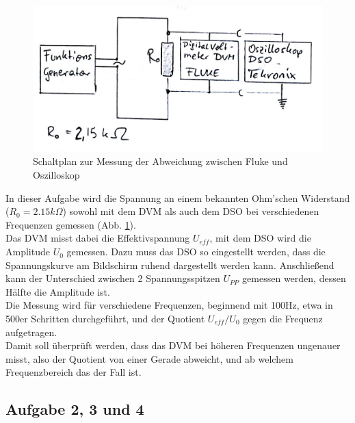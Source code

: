 \documentclass[12pt,a4paper]{article}
\begin{document}
\begin{multicols}{2}
\begin{figure}[H]
	\centering
	\includegraphics[scale=0.6]{./figure/Schaltplan_Aufgabe1.png}
	\caption{Schaltplan zur Messung der Abweichung zwischen Fluke und Oszilloskop}
	\label{fig:abw_flue_oszi}
\end{figure}

In dieser Aufgabe wird die Spannung an einem bekannten Ohm'schen Widerstand ($R_0 = 2.15 k\Omega$) sowohl mit dem DVM als auch dem DSO bei verschiedenen Frequenzen gemessen (Abb. \ref{fig:abw_flue_oszi}).\\
Das DVM misst dabei die Effektivspannung $U_{eff}$, mit dem DSO wird die Amplitude $U_0$ gemessen. Dazu muss das DSO so eingestellt werden, dass die Spannungskurve am Bildschirm ruhend dargestellt werden kann. Anschließend kann der Unterschied zwischen 2 Spannungsspitzen $U_{PP}$ gemessen werden, dessen Hälfte die Amplitude ist.\\
Die Messung wird für verschiedene Frequenzen, beginnend mit 100Hz, etwa in 500er Schritten durchgeführt, und der Quotient $U_{eff}/U_0$ gegen die Frequenz aufgetragen.\\
Damit soll überprüft werden, dass das DVM bei höheren Frequenzen ungenauer misst, also der Quotient von einer Gerade abweicht, und ab welchem Frequenzbereich das der Fall ist.

\subsection{Aufgabe 2, 3 und 4}


\end{multicols}
\end{document}
